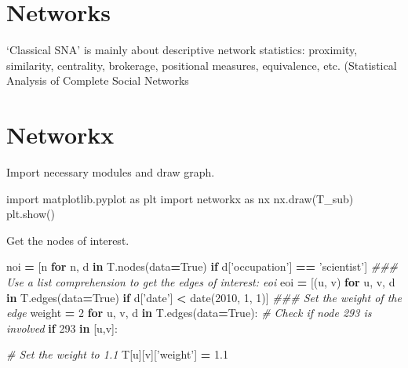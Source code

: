 \documentclass[]{book}
\newenvironment{Shaded}{\begin{snugshade}}{\end{snugshade}}
\newcommand{\KeywordTok}[1]{\textcolor[rgb]{0.13,0.29,0.53}{\textbf{#1}}}
\newcommand{\DecValTok}[1]{\textcolor[rgb]{0.00,0.00,0.81}{#1}}
\newcommand{\FloatTok}[1]{\textcolor[rgb]{0.00,0.00,0.81}{#1}}
\newcommand{\StringTok}[1]{\textcolor[rgb]{0.31,0.60,0.02}{#1}}
\newcommand{\ImportTok}[1]{#1}
\newcommand{\CommentTok}[1]{\textcolor[rgb]{0.56,0.35,0.01}{\textit{#1}}}
\newcommand{\VariableTok}[1]{\textcolor[rgb]{0.00,0.00,0.00}{#1}}
\newcommand{\ControlFlowTok}[1]{\textcolor[rgb]{0.13,0.29,0.53}{\textbf{#1}}}
\newcommand{\OperatorTok}[1]{\textcolor[rgb]{0.81,0.36,0.00}{\textbf{#1}}}
\newcommand{\NormalTok}[1]{#1}
\theoremstyle{definition}
\theoremstyle{definition}
\theoremstyle{definition}
\theoremstyle{remark}
\begin{document}
\section{Networks}\label{networks}

`Classical SNA' is mainly about descriptive network statistics:
proximity, similarity, centrality, brokerage, positional measures,
equivalence, etc. (Statistical Analysis of Complete Social Networks

\section{Networkx}\label{networkx}

Import necessary modules and draw graph.

\begin{Shaded}
\begin{Highlighting}[]
\ImportTok{import}\NormalTok{ matplotlib.pyplot }\ImportTok{as}\NormalTok{ plt}
\ImportTok{import}\NormalTok{ networkx }\ImportTok{as}\NormalTok{ nx}
\NormalTok{nx.draw(T_sub)}
\NormalTok{plt.show()}
\end{Highlighting}
\end{Shaded}

Get the nodes of interest.

\begin{Shaded}
\begin{Highlighting}[]
\NormalTok{noi }\OperatorTok{=}\NormalTok{ [n }\ControlFlowTok{for}\NormalTok{ n, d }\KeywordTok{in}\NormalTok{ T.nodes(data}\OperatorTok{=}\VariableTok{True}\NormalTok{) }\ControlFlowTok{if}\NormalTok{ d[}\StringTok{'occupation'}\NormalTok{] }\OperatorTok{==} \StringTok{'scientist'}\NormalTok{]}
\CommentTok{### Use a list comprehension to get the edges of interest: eoi}
\NormalTok{eoi }\OperatorTok{=}\NormalTok{ [(u, v) }\ControlFlowTok{for}\NormalTok{ u, v, d }\KeywordTok{in}\NormalTok{ T.edges(data}\OperatorTok{=}\VariableTok{True}\NormalTok{) }\ControlFlowTok{if}\NormalTok{ d[}\StringTok{'date'}\NormalTok{] }\OperatorTok{<}\NormalTok{ date(}\DecValTok{2010}\NormalTok{, }\DecValTok{1}\NormalTok{, }\DecValTok{1}\NormalTok{)]}
\CommentTok{### Set the weight of the edge}
\NormalTok{weight }\OperatorTok{=} \DecValTok{2}
\ControlFlowTok{for}\NormalTok{ u, v, d }\KeywordTok{in}\NormalTok{ T.edges(data}\OperatorTok{=}\VariableTok{True}\NormalTok{):}
  \CommentTok{# Check if node 293 is involved}
  \ControlFlowTok{if} \DecValTok{293} \KeywordTok{in}\NormalTok{ [u,v]:}
    
    \CommentTok{# Set the weight to 1.1}
\NormalTok{    T[u][v][}\StringTok{'weight'}\NormalTok{] }\OperatorTok{=} \FloatTok{1.1}
\end{Highlighting}
\end{Shaded}
\end{document}
